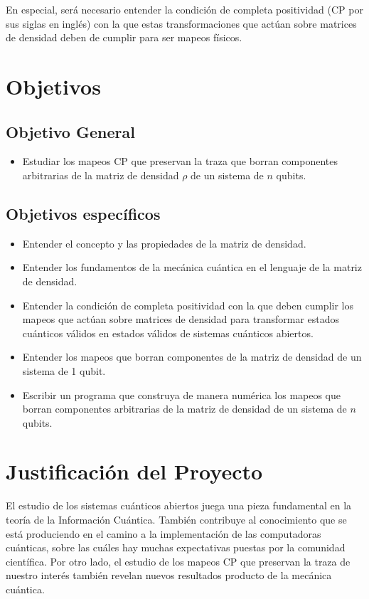 \documentclass[11pt, spanish, letterpage]{article} %
\begin{document}
En especial, será necesario entender la condición de completa positividad (CP
por sus siglas en inglés) con la que estas transformaciones que actúan sobre 
matrices de densidad deben de cumplir para ser mapeos físicos.  

 

\section{Objetivos}
\subsection{Objetivo General}
\begin{itemize}
	\item Estudiar los mapeos CP  que preservan la traza que borran
componentes arbitrarias de la matriz de densidad $\rho$ de un sistema de $n$
qubits. 	
\end{itemize}

\subsection{Objetivos específicos}
\begin{itemize}
\item Entender el concepto y las propiedades de la matriz de densidad.
\item Entender los fundamentos de la mecánica cuántica en el lenguaje de la
	  matriz de densidad.
\item Entender la condición de completa positividad con la que deben cumplir 
	  los mapeos que actúan sobre matrices de densidad para transformar estados
      cuánticos válidos en estados válidos de sistemas cuánticos abiertos.
\item Entender los mapeos que borran componentes de la matriz de densidad
	  de un sistema de 1 qubit.
\item Escribir un programa que construya de manera numérica los mapeos que 
	  borran componentes arbitrarias de la matriz de densidad de un sistema
	  de $n$ qubits.
\end{itemize}

\section{Justificación del Proyecto}%
El estudio de los sistemas cuánticos abiertos juega una pieza fundamental en la
teoría de la Información Cuántica. También contribuye al conocimiento que se
está produciendo en el camino a la implementación de las computadoras
cuánticas, sobre las cuáles hay muchas expectativas puestas por la comunidad
científica. Por otro lado, el estudio de los mapeos CP que preservan la traza
de nuestro interés también revelan nuevos resultados producto de la mecánica
cuántica.   
\end{document}
